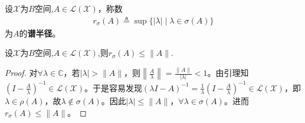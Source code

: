 \documentclass[../../main.tex]{subfiles}%
\begin{document}
\begin{definition}[谱半径]
设$\mathscr{X}$为$B$空间,$A\in\mathscr{L}(\mathscr{X})$，称数
\begin{align*}
r_{\sigma}(A)\triangleq\sup\{|\lambda|\mid\lambda\in\sigma(A)\}
\end{align*}
为$A$的\textbf{谱半径}。
\end{definition}

\begin{proposition}\label{proposition:算子范数都大于谱半径}
设$\mathscr{X}$为$B$空间,$A\in\mathscr{L}(\mathscr{X})$,则$r_{\sigma}(A)\leqslant\|A\|$.
\end{proposition}
\begin{proof}

对$\forall \lambda \in \mathbb{C}$，若$|\lambda|>\|A\|$，则$\left\| \frac{A}{\lambda} \right\| = \frac{\|A\|}{|\lambda|}<1$。由引理知$\left( I-\frac{A}{\lambda} \right)^{-1} \in \mathscr{L}(\mathscr{X})$。于是容易发现$(\lambda I - A)^{-1} = \frac{1}{\lambda}\left( I-\frac{A}{\lambda} \right)^{-1} \in \mathscr{L}(\mathscr{X})$，即$\lambda \in \rho(A)$，故$\lambda \notin \sigma(A)$。因此$|\lambda| \leqslant \|A\|$，$\forall \lambda \in \sigma(A)$。进而$r_{\sigma}(A) \leqslant \|A\|$。
\end{proof}
\end{document}
